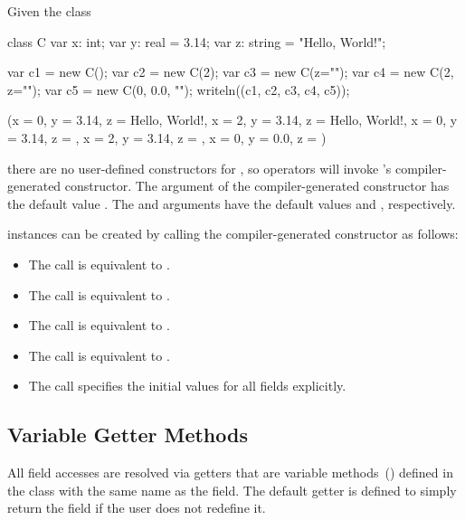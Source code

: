 \begin{example}
Given the class
\begin{chapelpre}
\end{chapelpre}
\begin{chapel}
class C {
  var x: int;
  var y: real = 3.14;
  var z: string = "Hello, World!";
}
\end{chapel}
\begin{chapelpost}
var c1 = new C();
var c2 = new C(2);
var c3 = new C(z="");
var c4 = new C(2, z="");
var c5 = new C(0, 0.0, "");
writeln((c1, c2, c3, c4, c5));
\end{chapelpost}
\begin{chapeloutput}
({x = 0, y = 3.14, z = Hello, World!}, {x = 2, y = 3.14, z = Hello, World!}, {x = 0, y = 3.14, z = }, {x = 2, y = 3.14, z = }, {x = 0, y = 0.0, z = })
\end{chapeloutput}
there are no user-defined constructors for , so  operators
will invoke 's compiler-generated constructor. The  argument
of the compiler-generated constructor has the default value .
The  and  arguments have the default values  and
, respectively.

 instances can be created by calling the compiler-generated constructor as follows:
\begin{itemize}
\item The call  is equivalent to .
\item The call  is equivalent to .
\item The call  is equivalent to .
\item The call  is equivalent to .
\item The call  specifies the initial values for all fields explicitly.
\end{itemize}
\end{example}

\subsection{Variable Getter Methods}
\label{Getter_Methods}

All field accesses are resolved via getters that are variable
methods~() defined in the class with the same
name as the field.  The default getter is defined to simply return the
field if the user does not redefine it.

